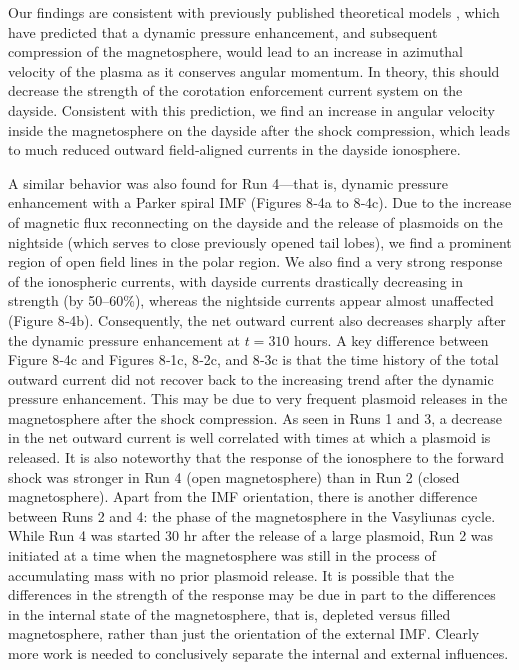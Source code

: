 Our findings are consistent with previously published theoretical models 
\cite{Cowley2003a,Cowley2007,Southwood2001a}, which have predicted that a dynamic pressure enhancement, and subsequent compression of the magnetosphere, would lead to an increase in azimuthal velocity of the plasma as it conserves angular momentum. In theory, this should decrease the strength of the corotation enforcement current system on the dayside. Consistent with this prediction, we find an increase in angular velocity inside the magnetosphere on the dayside after the shock compression, which leads to much reduced outward field‐aligned currents in the dayside ionosphere. 

A similar behavior was also found for Run 4—that is, dynamic pressure enhancement with a Parker spiral IMF (Figures 8‐4a to 8‐4c). Due to the increase of magnetic flux reconnecting on the dayside and the release of plasmoids on the nightside (which serves to close previously opened tail lobes), we find a prominent region of open field lines in the polar region. We also find a very strong response of the ionospheric currents, with dayside currents drastically decreasing in strength (by 50–60\%), whereas the nightside currents appear almost unaffected (Figure 8‐4b). Consequently, the net outward current also decreases sharply after the dynamic pressure enhancement at $t = 310$ hours. A key difference between Figure 8‐4c and Figures 8‐1c, 8‐2c, and 8‐3c is that the time history of the total outward current did not recover back to the increasing trend after the dynamic pressure enhancement. This may be due to very frequent plasmoid releases in the magnetosphere after the shock compression. As seen in Runs 1 and 3, a decrease in the net outward current is well correlated with times at which a plasmoid is released. It is also noteworthy that the response of the ionosphere to the forward shock was stronger in Run 4 (open magnetosphere) than in Run 2 (closed magnetosphere). Apart from the IMF orientation, there is another difference between Runs 2 and 4: the phase of the magnetosphere in the Vasyliunas cycle. While Run 4 was started 30 hr after the release of a large plasmoid, Run 2 was initiated at a time when the magnetosphere was still in the process of accumulating mass with no prior plasmoid release. It is possible that the differences in the strength of the response may be due in part to the differences in the internal state of the magnetosphere, that is, depleted versus filled magnetosphere, rather than just the orientation of the external IMF. Clearly more work is needed to conclusively separate the internal and external influences. 

